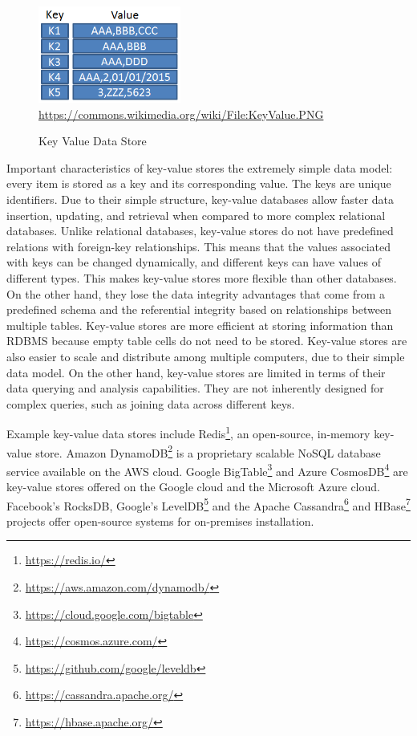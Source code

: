 \begin{figure}[h]
\centering
\includegraphics[height=1.25in]{KeyValue.png}
\scriptsize{\url{https://commons.wikimedia.org/wiki/File:KeyValue.PNG}}
\caption{Key Value Data Store}
\label{fig:keyvalue}
\end{figure}

Important characteristics of key-value stores the extremely simple data model: every item is stored as a key and its corresponding value. The keys are unique identifiers. Due to their simple structure, key-value databases allow faster data insertion, updating, and retrieval when compared to more complex relational databases. Unlike relational databases, key-value stores do not have predefined relations with foreign-key relationships. This means that the values associated with keys can be changed dynamically, and different keys can have values of different types. This makes key-value stores more flexible than other databases. On the other hand, they lose the data integrity advantages that come from a predefined schema and the referential integrity based on relationships between multiple tables. Key-value stores are more efficient at storing information than RDBMS because empty table cells do not need to be stored. Key-value stores are also easier to scale and distribute among multiple computers, due to their simple data model. On the other hand, key-value stores are limited in terms of their data querying and analysis capabilities. They are not inherently designed for complex queries, such as joining data across different keys. 

Example key-value data stores include Redis\footnote{\url{https://redis.io/}}, an open-source, in-memory key-value store. Amazon DynamoDB\footnote{\url{https://aws.amazon.com/dynamodb/}} is a proprietary scalable NoSQL database service available on the AWS cloud. Google BigTable\footnote{\url{https://cloud.google.com/bigtable}} and Azure CosmosDB\footnote{\url{https://cosmos.azure.com/}} are key-value stores offered on the Google cloud and the Microsoft Azure cloud. Facebook's RocksDB, Google's LevelDB\footnote{\url{https://github.com/google/leveldb}} and the Apache Cassandra\footnote{\url{https://cassandra.apache.org/}} and HBase\footnote{\url{https://hbase.apache.org/}} projects offer open-source systems for on-premises installation.

